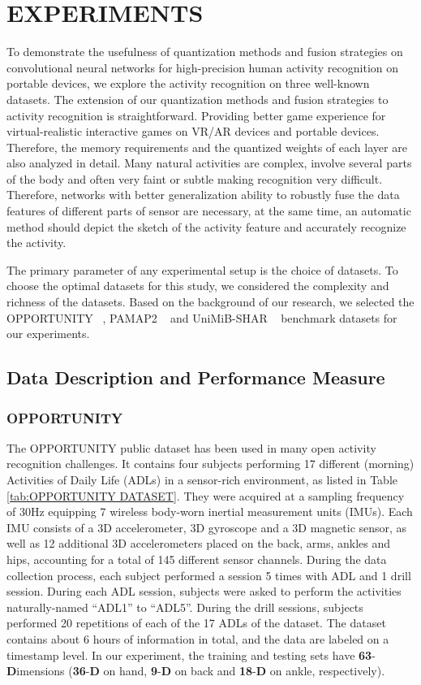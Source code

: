 \documentclass[twoside,twocolumn]{article}
\begin{document}
\section{EXPERIMENTS}\label{sec:EXPERIMENTS}
To demonstrate the usefulness of quantization methods and fusion strategies on convolutional neural networks for high-precision human activity recognition on portable devices, we explore the activity recognition on three well-known datasets. The extension of our quantization methods and fusion strategies to activity recognition is straightforward. Providing better game experience for virtual-realistic interactive games on VR/AR devices and portable devices. Therefore, the memory requirements and the quantized weights of each layer are also analyzed in detail. Many natural activities are complex, involve several parts of the body and often very faint or subtle making recognition very difficult. Therefore, networks with better generalization ability to robustly fuse the data features of different parts of sensor are necessary, at the same time, an automatic method should depict the sketch of the activity feature and accurately recognize the activity.

The primary parameter of any experimental setup is the choice of datasets. To choose the optimal datasets for this study, we considered the complexity and richness of the datasets. Based on the background of our research, we selected the OPPORTUNITY ~\cite{b51}, PAMAP2 ~\cite{b52} and UniMiB-SHAR ~\cite{b53} benchmark datasets for our experiments.

\subsection{Data Description and Performance Measure}
\subsubsection{OPPORTUNITY}
The OPPORTUNITY public dataset has been used in many open activity recognition challenges. It contains four subjects performing 17 different (morning) Activities of Daily Life (ADLs) in a sensor-rich environment, as listed in Table \ref{tab:OPPORTUNITY DATASET}. They were acquired at a sampling frequency of 30Hz equipping 7 wireless body-worn inertial measurement units (IMUs). Each IMU consists of a 3D accelerometer, 3D gyroscope and a 3D magnetic sensor, as well as 12 additional 3D accelerometers placed on the back, arms, ankles and hips, accounting for a total of 145 different sensor channels. During the data collection process, each subject performed a session 5 times with ADL and 1 drill session. During each ADL session, subjects were asked to perform the activities naturally-named ``ADL1'' to ``ADL5''. During the drill sessions, subjects performed 20 repetitions of each of the 17 ADLs of the dataset. The dataset contains about 6 hours of information in total, and the data are labeled on a timestamp level. In our experiment, the training and testing sets have \textbf{63}-\textbf{D}imensions (\textbf{36}-\textbf{D} on hand, \textbf{9}-\textbf{D} on back and \textbf{18}-\textbf{D} on ankle, respectively).
\end{document}
